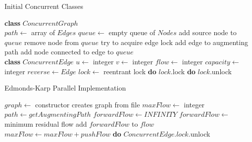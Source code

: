     
\begin{algorithm}
\caption{Initial Concurrent Classes}
\label{EKClassesInitial}
    \begin{algorithmic}[1]
    \State \textbf{class} $ConcurrentGraph$ \\
            \State $path \gets$ array of $Edges$
            \State $queue \gets$ empty queue of $Nodes$
            \State add source node to $queue$
                \State remove node from $queue$
                        \State try to acquire edge lock
                        \State add edge to augmenting path
                        \State add node connected to edge to $queue$
                    \EndIf
                \EndFor
            \EndWhile
        \EndFunction
    \\
    \State \textbf{class} $ConcurrentEdge$
        \State $u \gets$ integer
        \State $v \gets$ integer
        \State $flow \gets$ integer
        \State $capacity \gets$ integer
        \State $reverse \gets Edge$
        \State $lock \gets$ reentrant lock
            \State \textbf{do} $lock$.lock
        \EndFunction
            \State \textbf{do} $lock$.unlock
        \EndFunction
    \end{algorithmic}   
\end{algorithm}

\begin{algorithm} 
\caption{Edmonds-Karp Parallel Implementation}
\label{EKP}
    \begin{algorithmic}[1]
        \State $graph \gets$ constructor creates graph from file
        \State $maxFlow \gets$ integer
            \State $path \gets getAugmentingPath$
                \Return
            \Else
                \State $forwardFlow \gets INFINITY$
                    \State $forwardFlow \gets$ minimum residual flow
                \EndFor
                    \State add $forwardFlow$ to $flow$
                \EndFor
                \State $maxFlow \gets maxFlow + pushFlow$
                    \State \textbf{do} $ConcurrentEdge.lock$.unlock
                \EndFor
            \EndIf
        \EndWhile
    \EndFunction
    \end{algorithmic}
\end{algorithm}

